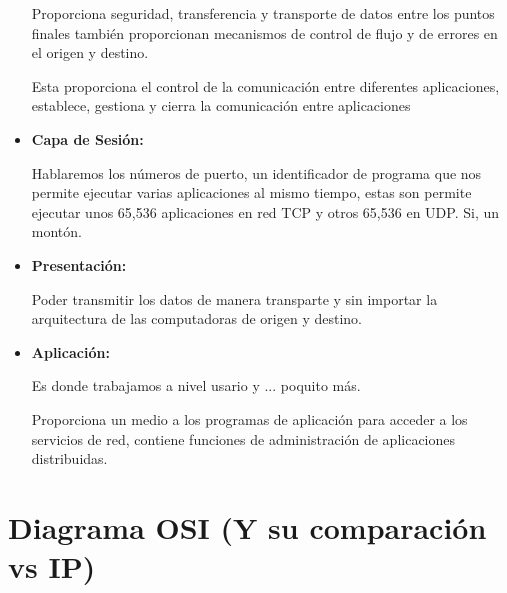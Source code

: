 \documentclass[12pt, fleqn]{report}                             %
\theoremstyle{break}                                            %
\begin{document}
\begin{itemize}
                    Proporciona seguridad, transferencia y transporte de datos entre los puntos finales
                    también proporcionan mecanismos de control de flujo y de errores en el origen y destino.

                    Esta proporciona el control de la comunicación entre diferentes aplicaciones, establece,
                    gestiona y cierra la comunicación entre aplicaciones

                \clearpage

                \item \textbf{Capa  de Sesión:}

                    Hablaremos los números de puerto, un identificador de programa que nos permite ejecutar
                    varias aplicaciones al mismo tiempo, estas son permite ejecutar unos 65,536 aplicaciones
                    en red TCP y otros 65,536 en UDP. Si, un montón.

                \item \textbf{Presentación:}

                    Poder transmitir los datos de manera transparte y sin importar la arquitectura de las
                    computadoras de origen y destino.

                \item \textbf{Aplicación:}

                    Es donde trabajamos a nivel usario y ... poquito más.

                    Proporciona un medio a los programas de aplicación para acceder a los servicios de red,
                    contiene funciones de administración de aplicaciones distribuidas.

            \end{itemize}


        \section{Diagrama OSI (Y su comparación vs IP)}
\end{document}
